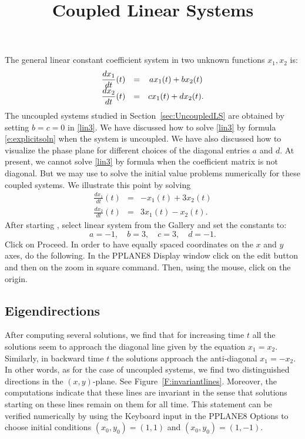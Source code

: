 \documentclass{ximera}
\title{Coupled Linear Systems}
\begin{document}
\begin{abstract}
\end{abstract}
\maketitle

  \label{s:3.5}


The general linear constant coefficient system in two unknown functions 
$x_1,x_2$ is:
\renewcommand{\arraystretch}{1.8}
\begin{equation}\label{lin3}
\begin{array}{ccc}
\displaystyle \frac{dx_1}{dt}(t) & = & ax_1(t) + bx_2(t) \\
\displaystyle \frac{dx_2}{dt}(t) & = & cx_1(t) + dx_2(t).
\end{array}
\end{equation}
\renewcommand{\arraystretch}{1.0}%
The uncoupled systems studied in Section~\ref{sec:UncoupledLS} are obtained 
by setting $b=c=0$ in \eqref{lin3}.  We have discussed how to solve \eqref{lin3} 
by formula \eqref{e:explicitsoln} when the system is uncoupled.  We have also 
discussed how to visualize the phase plane for different choices of the 
diagonal entries $a$ and $d$.  At present, we cannot
solve \eqref{lin3} by formula when the coefficient matrix is not diagonal.
But we may use {\pplane} to solve the initial value problems numerically 
for these coupled systems.  We illustrate this point by solving
\begin{eqnarray*}
\frac{dx_1}{dt}(t) & = &  -x_1(t) + 3x_2(t) \\
\frac{dx_2}{dt}(t) & = &  3x_1(t) - x_2(t).
\end{eqnarray*}
After starting {\pplane}, select {\sf linear system} from the
{\sf Gallery} and set the constants to:
\[
	a = -1,\quad b = 3,\quad c = 3, \quad d = -1.
\]
Click on {\sf Proceed}.  In order to have equally spaced coordinates on
the $x$ and $y$ axes, do the following.   In the {\sf PPLANE8 Display} 
window click on the {\sf edit} button and then on the {\sf zoom in square} 
command.  Then, using the mouse, click on the origin.

\subsection*{Eigendirections}

After computing several solutions, we find that for increasing
time $t$ all the solutions seem to approach the diagonal line
given by the equation $x_1=x_2$. Similarly, in backward time $t$
the solutions approach the anti-diagonal $x_1=-x_2$.  In other
words, as for the case of uncoupled systems, we find two
distinguished directions in the $(x,y)$-plane.  See
Figure~\ref{F:invariantlines}.  Moreover, the computations
indicate that these lines are invariant in the sense that
solutions starting on these lines remain on them for all time.
This statement can be verified numerically by using the {\sf
Keyboard input} in the {\sf PPLANE8 Options} to choose initial
conditions $(x_0,y_0)=(1,1)$ and $(x_0,y_0)=(1,-1)$.
\end{document}
